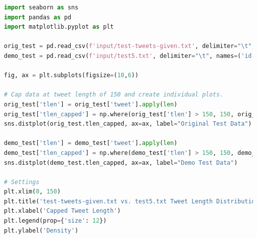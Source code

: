 \documentclass[runningheads]{llncs}
\begin{document}
\begin{lstlisting}[breaklines, language=Python]
import seaborn as sns
import pandas as pd
import matplotlib.pyplot as plt

orig_test = pd.read_csv(f'input/test-tweets-given.txt', delimiter="\t", names=('id','user','lang','tweet'))
demo_test = pd.read_csv(f'input/test5.txt', delimiter="\t", names=('id','user','lang','tweet'))

fig, ax = plt.subplots(figsize=(10,6))

# Cap data at tweet length of 150 and create individual plots.
orig_test['tlen'] = orig_test['tweet'].apply(len)
orig_test['tlen_capped'] = np.where(orig_test['tlen'] > 150, 150, orig_test['tlen'])
sns.distplot(orig_test.tlen_capped, ax=ax, label="Original Test Data")

demo_test['tlen'] = demo_test['tweet'].apply(len)
demo_test['tlen_capped'] = np.where(demo_test['tlen'] > 150, 150, demo_test['tlen'])
sns.distplot(demo_test.tlen_capped, ax=ax, label="Demo Test Data")

# Settings
plt.xlim(0, 150)
plt.title('test-tweets-given.txt vs. test5.txt Tweet Length Distribution')
plt.xlabel('Capped Tweet Length')
plt.legend(prop={'size': 12})
plt.ylabel('Density')
\end{lstlisting}
\end{document}
